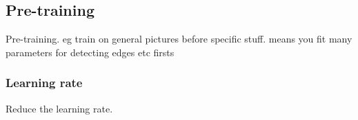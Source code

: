 
\subsection{Pre-training}

Pre-training. eg train on general pictures before specific stuff. means you fit many parameters for detecting edges etc firsts

\subsubsection{Learning rate}

Reduce the learning rate.

